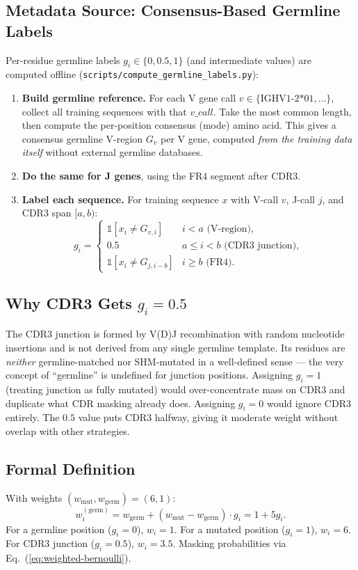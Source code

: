 \documentclass[11pt]{article}
\newcommand{\Ind}{\mathbb{1}}
\begin{document}
\subsection{Metadata Source: Consensus-Based Germline Labels}
Per-residue germline labels $g_i \in \{0, 0.5, 1\}$ (and intermediate
values) are computed offline
(\texttt{scripts/compute\_germline\_labels.py}):
\begin{enumerate}
\item \textbf{Build germline reference.} For each V gene call
$v \in \{\text{IGHV1-2*01}, \ldots\}$, collect all training sequences
with that $v\_call$. Take the most common length, then compute the
per-position consensus (mode) amino acid. This gives a consensus
germline V-region $G_v$ per V gene, computed \emph{from the training
data itself} without external germline databases.
\item \textbf{Do the same for J genes}, using the FR4 segment after CDR3.
\item \textbf{Label each sequence.} For training sequence $x$ with
V-call $v$, J-call $j$, and CDR3 span $[a, b)$:
\begin{equation}
g_i = \begin{cases}
\Ind[x_i \neq G_{v,i}] & i < a \text{ (V-region)}, \\
0.5 & a \le i < b \text{ (CDR3 junction)}, \\
\Ind[x_i \neq G_{j, i - b}] & i \ge b \text{ (FR4)}.
\end{cases}
\end{equation}
\end{enumerate}

\subsection{Why CDR3 Gets $g_i = 0.5$}
The CDR3 junction is formed by V(D)J recombination with random nucleotide
insertions and is not derived from any single germline template. Its
residues are \emph{neither} germline-matched nor SHM-mutated in a
well-defined sense --- the very concept of ``germline'' is undefined for
junction positions. Assigning $g_i = 1$ (treating junction as fully
mutated) would over-concentrate mass on CDR3 and duplicate what CDR
masking already does. Assigning $g_i = 0$ would ignore CDR3 entirely.
The $0.5$ value puts CDR3 halfway, giving it moderate weight without
overlap with other strategies.

\subsection{Formal Definition}
With weights $(w_{\text{mut}}, w_{\text{germ}}) = (6, 1)$:
\begin{equation}
w^{(\text{germ})}_i = w_{\text{germ}} + (w_{\text{mut}} - w_{\text{germ}}) \cdot g_i
= 1 + 5 g_i.
\end{equation}
For a germline position ($g_i = 0$), $w_i = 1$. For a mutated
position ($g_i = 1$), $w_i = 6$. For CDR3 junction ($g_i = 0.5$),
$w_i = 3.5$. Masking probabilities via
Eq.~(\ref{eq:weighted-bernoulli}).
\end{document}
